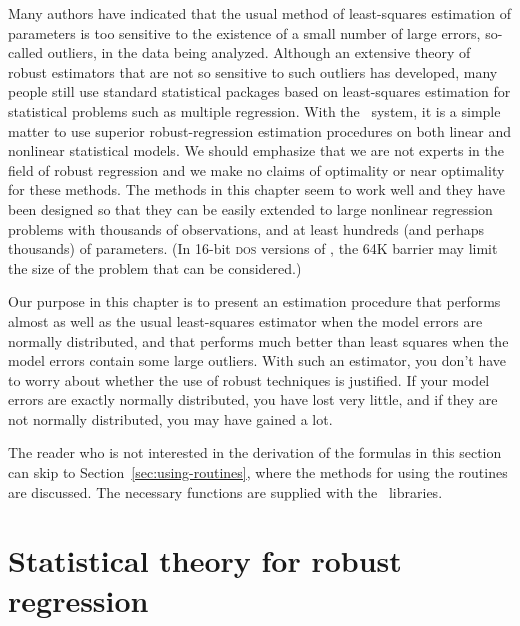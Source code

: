\documentclass{admbmanual}
\begin{document}
Many authors have indicated that the usual method of least-squares estimation of parameters is too sensitive to the existence of a 
small number of large errors, so-called outliers, in the data being analyzed.
Although an extensive theory of robust estimators that are not so 
sensitive to 
such outliers has developed, many people still use standard statistical
packages based on least-squares estimation for statistical problems
such as multiple regression. With the \scAD\ system, it is a simple matter
to use superior
robust-regression estimation procedures on both linear and
nonlinear statistical models.
We should emphasize that we are not experts in the field of robust regression
and we make no claims of optimality or near optimality for these methods.
 The methods in this chapter seem to work well and they
have been designed so that they can be easily extended to large 
nonlinear regression problems with thousands of observations,
and at least hundreds (and perhaps thousands) of parameters. 
(In 16-bit \textsc{dos} versions of \scAD, the 64K barrier may limit the
size of the problem that can be considered.)

Our purpose in this chapter is to present an estimation procedure
that performs almost as well as the usual least-squares estimator
when the model errors are normally distributed, and that performs much
better than least squares when the model errors contain some large
outliers. With such an estimator, you don't have to worry
about whether the use of robust techniques is justified. If
your model errors are exactly normally distributed, you have lost
very little, and if they are not normally distributed, you may 
have gained a lot.

The reader who is not interested in
the derivation of the formulas in this 
section can skip to Section~\ref{sec:using-routines}, %
 where the methods for
using the routines are discussed. 
The necessary functions are supplied with the \scAD\ libraries. 


\section{Statistical theory for robust regression}
\end{document}
